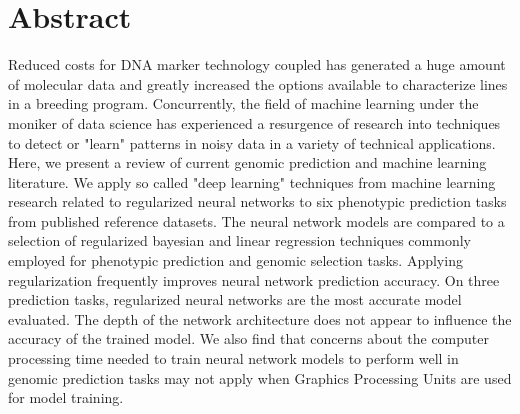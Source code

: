 \chapter*{Abstract}

Reduced costs for DNA marker technology coupled has generated a huge amount of
molecular data and greatly increased the options available to characterize lines 
in a breeding program. Concurrently, the field of machine learning under
the moniker of data science has experienced a resurgence of research into 
techniques to detect or "learn" patterns in noisy data in a variety of 
technical applications. Here, we present a review of current genomic prediction 
and machine learning literature. We apply so called "deep learning"
techniques from machine learning research related to regularized neural networks to six 
phenotypic prediction tasks from published reference datasets. 
The neural network models are compared to a selection of regularized bayesian 
and linear regression techniques commonly employed for phenotypic prediction and genomic
selection tasks. Applying regularization frequently improves neural network 
prediction accuracy. On three prediction tasks, regularized neural networks 
are the most accurate model evaluated. The depth of the network architecture
does not appear to influence the accuracy of the trained model. We also find
that concerns about the computer processing time needed to train neural network 
models to perform well in genomic prediction tasks may not apply when Graphics
Processing Units are used for model training.



